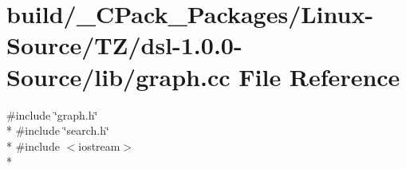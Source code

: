 \section{build/\-\_\-\-C\-Pack\-\_\-\-Packages/\-Linux-\/\-Source/\-T\-Z/dsl-\/1.0.0-\/\-Source/lib/graph.cc File Reference}
\label{build_2__CPack__Packages_2Linux-Source_2TZ_2dsl-1_80_80-Source_2lib_2graph_8cc}
{\ttfamily \#include \char`\"{}graph.\-h\char`\"{}}\\*
{\ttfamily \#include \char`\"{}search.\-h\char`\"{}}\\*
{\ttfamily \#include $<$iostream$>$}\\*
